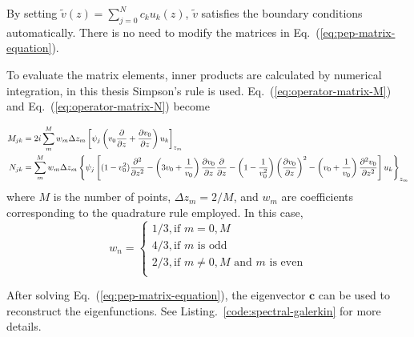 By setting $\tilde{v}(z) = \sum_{j=0}^{N} c_ku_k(z)$, $\tilde{v}$ satisfies the boundary conditions automatically. There is no need to modify the matrices in Eq.~(\ref{eq:pep-matrix-equation}).

To evaluate the matrix elements, inner products are calculated by numerical integration, in this thesis Simpson's rule is used. Eq.~(\ref{eq:operator-matrix-M}) and Eq.~(\ref{eq:operator-matrix-N}) become

\begin{align}
	M_{jk} & = 2i \sum_{m}^{M} w_m \Delta z_m \left[\psi_{j}\left(v_0\pdv{}{z} +\pdv{v_0}{z} \right)u_{k}\right]_{z_m} \\
	N_{jk} & = \sum_{m}^{M} w_m \Delta z_m \left\{
	\psi_{j} \left[(1-v_0^2)\pdv[2]{}{z} -\left(3v_0 + \frac{1}{v_0}\right)\pdv{v_0}{z}\pdv{}{z}
		- \left(1-\frac{1}{v_0^2}\right)\left(\pdv{v_0}{z}\right)^2 - \left(v_0+\frac{1}{v_0}\right)\pdv[2]{v_0}{z}\right] u_{k} \right\}_{z_m}
\end{align}
where $M$ is the number of points, $\Delta z_m = 2/M$, and $w_m$ are coefficients corresponding to the quadrature rule employed. In this case,
\begin{equation}
	w_n = \begin{cases}
		1/3, \text{if $m=0,M$}                     \\
		4/3, \text{if $m$ is odd}                  \\
		2/3, \text{if $m\neq 0,M$ and $m$ is even} \\
	\end{cases}
\end{equation}

After solving Eq.~(\ref{eq:pep-matrix-equation}), the eigenvector $\mathbf{c}$ can be used to reconstruct the eigenfunctions. See Listing.~\ref{code:spectral-galerkin} for more details.

